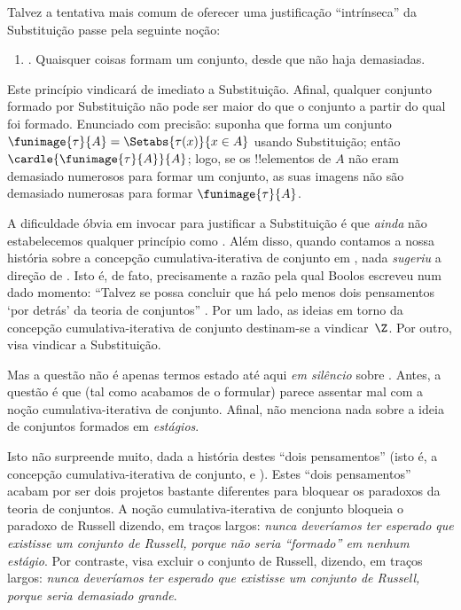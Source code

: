 \documentclass[../../../include/open-logic-section]{subfiles}
\begin{document}

Talvez a tentativa mais comum de oferecer uma justificação ``intrínseca'' da
Substituição passe pela seguinte noção:
\begin{enumerate}
	\item[] \limofsize. Quaisquer coisas formam um conjunto, desde que não haja
	demasiadas.
\end{enumerate}
Este princípio vindicará de imediato a Substituição. Afinal, qualquer
conjunto formado por Substituição não pode ser maior do que o conjunto a partir do qual
foi formado. Enunciado com precisão: suponha que forma um conjunto
$\funimage{\tau}{A} = \Setabs{\tau(x)}{x \in A}$ usando Substituição;
então $\cardle{\funimage{\tau}{A}}{A}$; logo, se os !!{element}os de $A$
não eram demasiado numerosos para formar um conjunto, as suas imagens não são demasiado numerosas
para formar $\funimage{\tau}{A}$. 

A dificuldade óbvia em invocar \limofsize{} para justificar a
Substituição é que \emph{ainda} não estabelecemos qualquer princípio
como \limofsize. Além disso, quando contamos a nossa história sobre a
concepção cumulativa-iterativa de conjunto em
, nada \emph{sugeriu}
a direção de \limofsize. Isto é, de fato, precisamente a razão pela qual Boolos
escreveu num dado momento: ``Talvez se possa concluir que há pelo menos
dois pensamentos `por detrás' da teoria de conjuntos'' \citeyearpar[p.~19]{Boolos1989}. Por um lado, as ideias em torno da concepção cumulativa-iterativa
de conjunto destinam-se a vindicar~$\Z$. Por outro,
\limofsize{} visa vindicar a Substituição. 

Mas a questão não é apenas termos estado até aqui \emph{em silêncio}
sobre \limofsize. Antes, a questão é que \limofsize{} (tal como acabamos de o
formular) parece assentar mal com a noção cumulativa-iterativa
de conjunto. Afinal, não menciona nada sobre a ideia de conjuntos
formados em \emph{estágios}.

Isto não surpreende muito, dada a história destes
``dois pensamentos'' (isto é, a concepção cumulativa-iterativa de conjunto,
e \limofsize). Estes ``dois pensamentos'' acabam por ser dois
projetos bastante diferentes para bloquear os paradoxos da teoria de conjuntos.
A noção cumulativa-iterativa de conjunto bloqueia o paradoxo de Russell
dizendo, em traços largos: \emph{nunca deveríamos ter esperado que existisse um conjunto de Russell,
porque não seria ``formado'' em nenhum estágio}. Por contraste,
\limofsize{} visa excluir o conjunto de Russell, dizendo, em traços largos:
\emph{nunca deveríamos ter esperado que existisse um conjunto de Russell,
porque seria demasiado grande}. 
\end{document}
